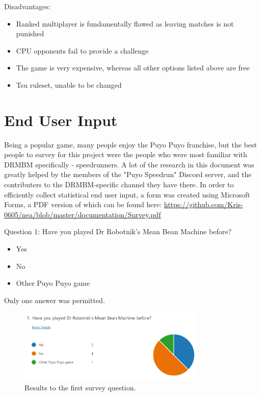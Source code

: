 \documentclass{report}
\begin{document}
Disadvantages: 

\begin{itemize}
    \renewcommand\labelitemi{--}
    \item Ranked multiplayer is fundamentally flawed as leaving matches is not punished
    \item CPU opponents fail to provide a challenge
    \item The game is very expensive, whereas all other options listed above are free
    \item Tsu ruleset, unable to be changed
\end{itemize}

\section{End User Input}

Being a popular game, many people enjoy the Puyo Puyo franchise, but the best people to survey for this project were the people who were most familiar with DRMBM specifically - speedrunners. A lot of the research in this document was greatly helped by the members of the "Puyo Speedrun" Discord server, and the contributers to the DRMBM-specific channel they have there.
In order to efficiently collect statistical end user input, a form was created using Microsoft Forms, a PDF version of which can be found here: \href{https://github.com/Kris-0605/nea/blob/master/documentation/Survey.pdf}{https://github.com/Kris-0605/nea/blob/master/documentation/Survey.pdf}

Question 1: Have you played Dr Robotnik's Mean Bean Machine before?
\begin{itemize}
    \renewcommand\labelitemi{--}
    \item Yes
    \item No
    \item Other Puyo Puyo game
\end{itemize}
Only one answer was permitted.

\begin{figure}[ht]
    \centering
    \includegraphics[width=0.8\textwidth]{survey1.png}
    \caption{\label{fig:survey1}Results to the first survey question.}
\end{figure}
\end{document}
